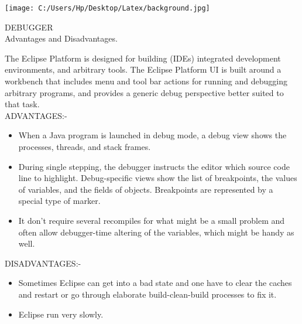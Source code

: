 \documentclass[10pt]{article}
\begin{document}
\noindent\begin{minipage}{0.3\textwidth}%
	\texttt{[image: C:/Users/Hp/Desktop/Latex/background.jpg]}
\end{minipage}%
\hfill%
\begin{minipage}{0.6\textwidth}\raggedleft
	DEBUGGER\\
	Advantages and Disadvantages.
\end{minipage}
\newline
\newline
The Eclipse Platform is designed for building (IDEs) integrated development environments, and arbitrary tools. The Eclipse Platform UI is built around a workbench that includes menu and tool bar actions for running and debugging arbitrary programs, and provides a generic debug perspective better suited to that task. \\
ADVANTAGES:-
\begin{itemize} [noitemsep,topsep=0pt]
	\item When a Java program is launched in debug mode, a debug view shows the processes, threads, and stack frames.
	\item During single stepping, the debugger instructs the editor which source
	code line to highlight. Debug-specific views show the list of breakpoints, the values of variables, and the fields of objects. Breakpoints are represented by a special type of marker.
	\item It don't require several recompiles for what might be a small problem and
	often allow debugger-time altering of the variables, which might be handy as well.
\end{itemize}
	DISADVANTAGES:-
	\begin{itemize} [noitemsep,topsep=0pt]
\item	Sometimes Eclipse can get into a bad state and one have to clear the caches and restart or go through elaborate build-clean-build processes to fix it.
\item	Eclipse run very slowly.
\end{itemize}
 
\end{document}
